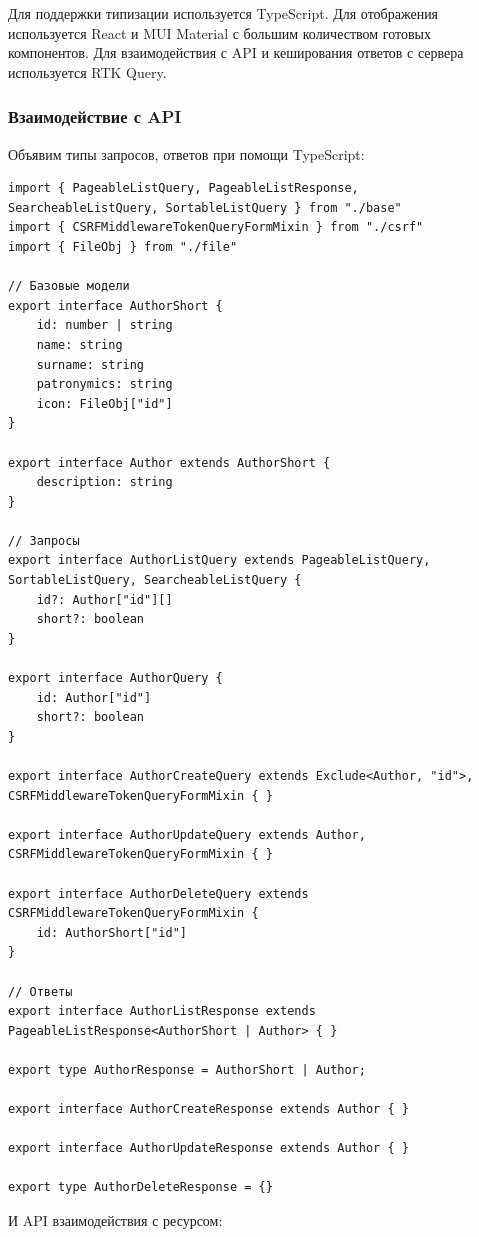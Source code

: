 \documentclass[a4paper,14pt]{extarticle}
\begin{document}
Для поддержки типизации используется TypeScript. 
Для отображения используется React и MUI Material с 
большим количеством готовых компонентов. 
Для взаимодействия с API и кеширования ответов с сервера
используется RTK Query.

\subsubsection{Взаимодействие с API}
Объявим типы запросов, ответов при помощи TypeScript:
\begin{verbatim}
import { PageableListQuery, PageableListResponse, SearcheableListQuery, SortableListQuery } from "./base"
import { CSRFMiddlewareTokenQueryFormMixin } from "./csrf"
import { FileObj } from "./file"

// Базовые модели
export interface AuthorShort {
    id: number | string
    name: string
    surname: string
    patronymics: string
    icon: FileObj["id"]
}

export interface Author extends AuthorShort {
    description: string
}

// Запросы
export interface AuthorListQuery extends PageableListQuery, SortableListQuery, SearcheableListQuery {
    id?: Author["id"][]
    short?: boolean
}

export interface AuthorQuery {
    id: Author["id"]
    short?: boolean
}

export interface AuthorCreateQuery extends Exclude<Author, "id">, CSRFMiddlewareTokenQueryFormMixin { }

export interface AuthorUpdateQuery extends Author, CSRFMiddlewareTokenQueryFormMixin { }

export interface AuthorDeleteQuery extends CSRFMiddlewareTokenQueryFormMixin {
    id: AuthorShort["id"]
}

// Ответы
export interface AuthorListResponse extends PageableListResponse<AuthorShort | Author> { }

export type AuthorResponse = AuthorShort | Author;

export interface AuthorCreateResponse extends Author { }

export interface AuthorUpdateResponse extends Author { }

export type AuthorDeleteResponse = {}
\end{verbatim}

И API взаимодействия с ресурсом:
\end{document}

